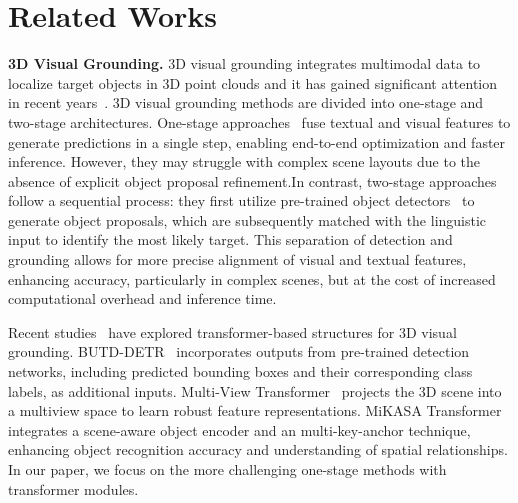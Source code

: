\section{Related Works}
\label{sec:related}

\noindent\textbf{3D Visual Grounding.} 3D visual grounding integrates multimodal data to localize target objects in 3D point clouds and it has gained significant attention in recent years~\citep{dionisio20133d,wang2019reinforced, feng2021cityflow}. 3D visual grounding methods are divided into one-stage and two-stage architectures. One-stage approaches~\citep{liao2020real,luo20223d,geng2024viewinfer3d,he2024refmask3d} fuse textual and visual features to generate predictions in a single step, enabling end-to-end optimization and faster inference. However, they may struggle with complex scene layouts due to the absence of explicit object proposal refinement.In contrast, two-stage approaches~\citep{yang2019dynamic,achlioptas2020referit3d,huang2022multi,guo2023viewrefer,wu2024dora,chang2024mikasa} follow a sequential process: they first utilize pre-trained object detectors~\citep{jiang2020pointgroup,wu2024dora} to generate object proposals, which are subsequently matched with the linguistic input to identify the most likely target. This separation of detection and grounding allows for more precise alignment of visual and textual features, enhancing accuracy, particularly in complex scenes, but at the cost of increased computational overhead and inference time. 

Recent studies~\citep{jain2022bottom,roh2022languagerefer,huang2022multi,Shi_2024_CVPR,chang2024mikasa} have explored transformer-based structures for 3D visual grounding. BUTD-DETR~\citep{jain2022bottom} incorporates outputs from pre-trained detection networks, including predicted bounding boxes and their corresponding class labels, as additional inputs. Multi-View Transformer~\citep{huang2022multi} projects the 3D scene into a multiview space to learn robust feature representations. MiKASA Transformer~\citep{chang2024mikasa} integrates a scene-aware object encoder and an multi-key-anchor technique, enhancing object recognition accuracy and understanding of spatial relationships. In our paper, we focus on the more challenging one-stage methods with transformer modules.  

